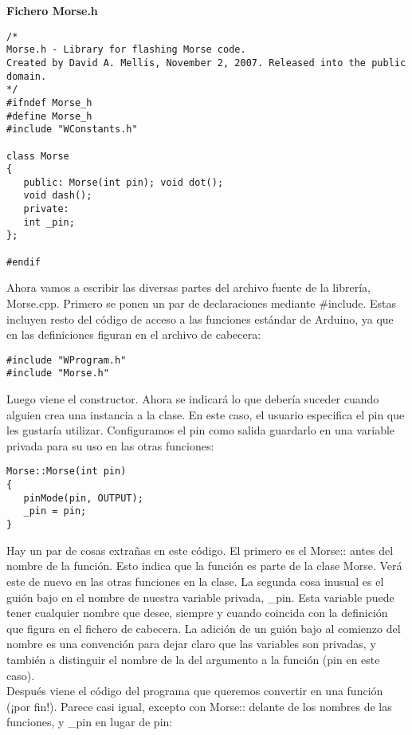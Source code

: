 \textbf{Fichero Morse.h}
\begin{lstlisting}
/*
Morse.h - Library for flashing Morse code.
Created by David A. Mellis, November 2, 2007. Released into the public domain.
*/
#ifndef Morse_h
#define Morse_h
#include "WConstants.h"

class Morse
{
   public: Morse(int pin); void dot();
   void dash();
   private:
   int _pin;
};

#endif
\end{lstlisting}
Ahora vamos a escribir las diversas partes del archivo fuente de la librería, Morse.cpp.
Primero se ponen un par de declaraciones mediante \#include. Estas incluyen resto del código de acceso a las funciones estándar de Arduino, ya que en las definiciones figuran en el archivo de cabecera:
\begin{lstlisting}
#include "WProgram.h"
#include "Morse.h"
\end{lstlisting}
Luego viene el constructor. Ahora se indicará lo que debería suceder cuando alguien crea una instancia a la clase. En este caso, el usuario especifica el pin que les gustaría utilizar. Configuramos el pin como salida guardarlo en una variable privada para su uso en las otras funciones:
\begin{lstlisting}
Morse::Morse(int pin)
{
   pinMode(pin, OUTPUT);
   _pin = pin;
}
\end{lstlisting}
Hay un par de cosas extrañas en este código. El primero es el Morse:: antes del nombre de la función. Esto indica que la función es parte de la clase Morse. Verá este de nuevo en las otras funciones en la clase. La segunda cosa inusual es el guión bajo en el nombre de nuestra variable privada, \_pin. Esta variable puede tener cualquier nombre que desee, siempre y cuando coincida con la definición que figura en el fichero de cabecera. La adición de un guión bajo al comienzo del nombre es una convención para dejar claro que las variables son privadas, y también a distinguir el nombre de la del argumento a la función (pin en este caso).\\
Después viene el código del programa que queremos convertir en una función (¡por fin!). Parece casi igual, excepto con Morse:: delante de los nombres de las funciones, y \_pin en lugar de pin:

